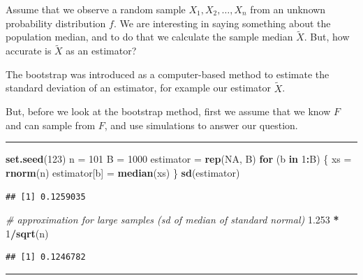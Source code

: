 \documentclass[]{article}
\newenvironment{Shaded}{\begin{snugshade}}{\end{snugshade}}
\newcommand{\CommentTok}[1]{\textcolor[rgb]{0.56,0.35,0.01}{\textit{#1}}}
\newcommand{\ControlFlowTok}[1]{\textcolor[rgb]{0.13,0.29,0.53}{\textbf{#1}}}
\newcommand{\DecValTok}[1]{\textcolor[rgb]{0.00,0.00,0.81}{#1}}
\newcommand{\FloatTok}[1]{\textcolor[rgb]{0.00,0.00,0.81}{#1}}
\newcommand{\KeywordTok}[1]{\textcolor[rgb]{0.13,0.29,0.53}{\textbf{#1}}}
\newcommand{\NormalTok}[1]{#1}
\newcommand{\OperatorTok}[1]{\textcolor[rgb]{0.81,0.36,0.00}{\textbf{#1}}}
\newcommand{\OtherTok}[1]{\textcolor[rgb]{0.56,0.35,0.01}{#1}}
\newcommand{\StringTok}[1]{\textcolor[rgb]{0.31,0.60,0.02}{#1}}
\begin{document}
Assume that we observe a random sample \(X_1, X_2, \ldots, X_n\) from an
unknown probability distribution \(f\). We are interesting in saying
something about the population median, and to do that we calculate the
sample median \(\tilde{X}\). But, how accurate is \(\tilde{X}\) as an
estimator?

The bootstrap was introduced as a computer-based method to estimate the
standard deviation of an estimator, for example our estimator
\(\tilde{X}\).

But, before we look at the bootstrap method, first we assume that we
know \(F\) and can sample from \(F\), and use simulations to answer our
question.

\begin{center}\rule{0.5\linewidth}{\linethickness}\end{center}

\begin{Shaded}
\begin{Highlighting}[]
\KeywordTok{set.seed}\NormalTok{(}\DecValTok{123}\NormalTok{)}
\NormalTok{n =}\StringTok{ }\DecValTok{101}
\NormalTok{B =}\StringTok{ }\DecValTok{1000}
\NormalTok{estimator =}\StringTok{ }\KeywordTok{rep}\NormalTok{(}\OtherTok{NA}\NormalTok{, B)}
\ControlFlowTok{for}\NormalTok{ (b }\ControlFlowTok{in} \DecValTok{1}\OperatorTok{:}\NormalTok{B) \{}
\NormalTok{    xs =}\StringTok{ }\KeywordTok{rnorm}\NormalTok{(n)}
\NormalTok{    estimator[b] =}\StringTok{ }\KeywordTok{median}\NormalTok{(xs)}
\NormalTok{\}}
\KeywordTok{sd}\NormalTok{(estimator)}
\end{Highlighting}
\end{Shaded}

\begin{verbatim}
## [1] 0.1259035
\end{verbatim}

\begin{Shaded}
\begin{Highlighting}[]
\CommentTok{# approximation for large samples (sd of median of standard normal)}
\FloatTok{1.253} \OperatorTok{*}\StringTok{ }\DecValTok{1}\OperatorTok{/}\KeywordTok{sqrt}\NormalTok{(n)}
\end{Highlighting}
\end{Shaded}

\begin{verbatim}
## [1] 0.1246782
\end{verbatim}

\begin{center}\rule{0.5\linewidth}{\linethickness}\end{center}
\end{document}
